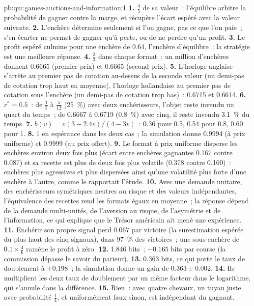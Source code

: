 \begin{solution}{pb:qm:games-auctions-and-information:1}
\textbf{1.} $\frac45$ de sa valeur~: l'équilibre arbitre la probabilité de gagner contre la marge, et récupère l'écart espéré avec la valeur suivante.
\textbf{2.} L'enchère détermine seulement si l'on gagne, pas ce que l'on paie~; s'en écarter ne permet de gagner qu'à perte, ou de ne perdre qu'un profit.
\textbf{3.} Le profit espéré culmine pour une enchère de 0.64, l'enchère d'équilibre~: la stratégie est une meilleure réponse.
\textbf{4.} $\frac23$ dans chaque format~; un million d'enchères donnent 0.6665 (premier prix) et 0.6665 (second prix).
\textbf{5.} L'horloge anglaise s'arrête au premier pas de cotation au-dessus de la seconde valeur (un demi-pas de cotation trop haut en moyenne), l'horloge hollandaise au premier pas de cotation sous l'enchère (un demi-pas de cotation trop bas)~: 0.6715 et 0.6614.
\textbf{6.} $r^* = 0.5$~: de $\frac13$ à $\frac5{12}$ (25~\%) avec deux enchérisseurs, l'objet reste invendu un quart du temps~; de 0.6667 à 0.6719 (0.8~\%) avec cinq, il reste invendu 3.1~\% du temps.
\textbf{7.} $b(v) = v(3 - 2.4v)/(4 - 3v)$~: 0.36 pour 0.5, 0.54 pour 0.8, 0.60 pour 1.
\textbf{8.} 1 en espérance dans les deux cas~; la simulation donne 0.9994 (à prix uniforme) et 0.9999 (au prix offert).
\textbf{9.} Le format à prix uniforme disperse les enchères environ deux fois plus (écart entre enchères gagnantes 0.167 contre 0.087) et sa recette est plus de deux fois plus volatile (0.378 contre 0.160)~: enchères plus agressives et plus dispersées
ainsi qu'une volatilité plus forte d'une enchère à l'autre, comme le rapportait l'étude.
\textbf{10.} Avec une demande unitaire, des enchérisseurs symétriques neutres au risque et des valeurs indépendantes, l'équivalence des recettes rend les formats égaux en moyenne~; la réponse dépend de la demande multi-unités, de l'aversion au risque, de l'asymétrie et
de l'information, ce qui explique que le Trésor américain ait mené une expérience.
\textbf{11.} Enchérir son propre signal perd 0.067 par victoire (la surestimation espérée du plus haut des cinq signaux), dans 97~\% des victoires~; une sous-enchère de $0.1 \times \frac46$ ramène le profit à zéro.
\textbf{12.} 1.846 bits~; $-0.165$ bits par course (la commission dépasse le savoir du parieur).
\textbf{13.} 0.363 bits, ce qui porte le taux de doublement à $+0.198$~; la simulation donne un gain de $0.363 \pm 0.002$.
\textbf{14.} Ils multiplient les deux taux de doublement par un même facteur dans le logarithme, qui s'annule dans la différence.
\textbf{15.} Rien~: avec quatre chevaux, un tuyau juste avec probabilité $\frac14$, et uniformément faux sinon, est indépendant du gagnant.

\end{solution}
